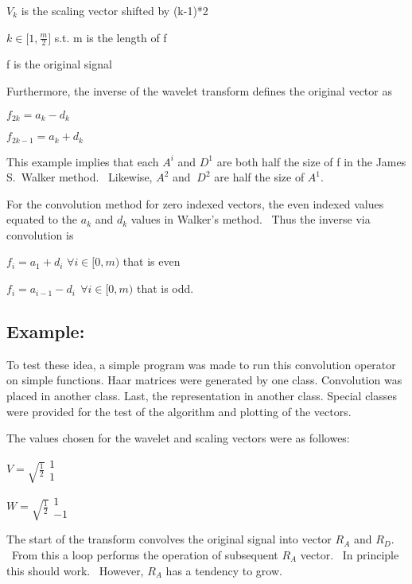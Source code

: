 \documentclass{article}
\begin{document}
\qquad $V_{k}$ is the scaling vector shifted by (k-1)*2

\qquad $k\in \lbrack 1,\frac{m}{2}]$ s.t. m is the length of f

\qquad f is the original signal

\bigskip

Furthermore, the inverse of the wavelet transform defines the original
vector as

$f_{2k}=a_{k}-d_{k}$

$f_{2k-1}=a_{k}+d_{k}$

\bigskip

This example implies that each $A^{i}$ and $D^{1}$ are both half the size of
f in the James S.\ Walker method. \ Likewise, $A^{2}$ and $\ D^{2}$ are half
the size of $A^{1}$.

\bigskip

For the convolution method for zero indexed vectors, the even indexed values
equated to the $a_{k}$ and $d_{k}$ values in Walker's method. \ Thus the
inverse via convolution is

\qquad $f_{i}=a_{1}+d_{i}$ $\forall i\in \lbrack 0,m)$ that is even

\qquad $f_{i}=a_{i-1}-d_{i\,}$ $\forall i\in \lbrack 0,m)$ that is odd.

\bigskip

\subsection{Example:}

To test these idea, a simple program was made to run this convolution
operator on simple functions. Haar matrices were generated by one class.
Convolution was placed in another class. Last, the representation in another
class. Special classes were provided for the test of the algorithm and
plotting of the vectors.

The values chosen for the wavelet and scaling vectors were as followes:

\qquad $V=\sqrt{\frac{1}{2}} 
\begin{array}{c}
1 \\ 
1
\end{array}
$

\qquad $W=\sqrt{\frac{1}{2}} 
\begin{array}{c}
1 \\ 
-1
\end{array}
$

The start of the transform convolves the original signal into vector $R_{A}$
and $R_{D}$. \ From this a loop performs the operation of subsequent $R_{A}$
vector. \ In principle this should work. \ However, $R_{A}$ has a tendency
to grow.
\end{document}
